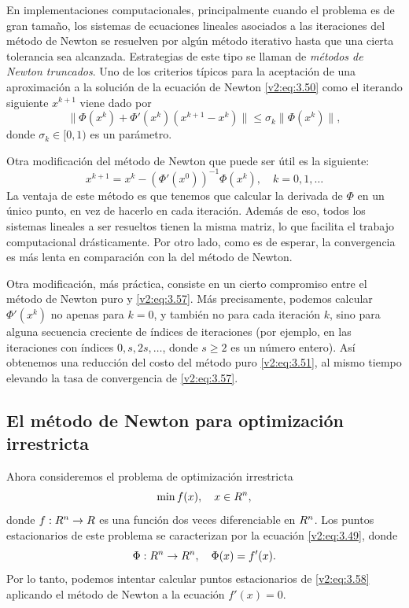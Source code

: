 En implementaciones computacionales, principalmente cuando el problema es de gran tamaño, los sistemas de ecuaciones lineales asociados a las iteraciones del método de Newton se resuelven por algún método iterativo hasta que una cierta tolerancia sea alcanzada. Estrategias de este tipo se llaman de \textit{métodos de Newton truncados}. Uno de los criterios típicos para la aceptación de una aproximación a la solución de la ecuación de Newton \eqref{v2:eq:3.50} como el iterando siguiente $x^{k+1}$ viene dado por
\begin{equation}
    \|\Phi(x^k) + \Phi'(x^k)(x^{k+1} - x^k)\| \le \sigma_k \|\Phi(x^k)\|,
    \label{v2:eq:3.56}
\end{equation}
donde $\sigma_k \in [0, 1)$ es un parámetro.

Otra modificación del método de Newton que puede ser útil es la siguiente:
\begin{equation}
    x^{k+1} = x^k - (\Phi'(x^0))^{-1}\Phi(x^k), \quad k = 0, 1, \dots
    \label{v2:eq:3.57}
\end{equation}
La ventaja de este método es que tenemos que calcular la derivada de $\Phi$ en un único punto, en vez de hacerlo en cada iteración. Además de eso, todos los sistemas lineales a ser resueltos tienen la misma matriz, lo que facilita el trabajo computacional drásticamente. Por otro lado, como es de esperar, la convergencia es más lenta en comparación con la del método de Newton.

Otra modificación, más práctica, consiste en un cierto compromiso entre el método de Newton puro y \eqref{v2:eq:3.57}. Más precisamente, podemos calcular $\Phi'(x^k)$ no apenas para $k = 0$, y también no para cada iteración $k$, sino para alguna secuencia creciente de índices de iteraciones (por ejemplo, en las iteraciones con índices $0, s, 2s, \dots$, donde $s \ge 2$ es un número entero). Así obtenemos una reducción del costo del método puro \eqref{v2:eq:3.51}, al mismo tiempo elevando la tasa de convergencia de \eqref{v2:eq:3.57}.

\subsection{El método de Newton para optimización irrestricta}\label{v2:sec:3.2.2}

Ahora consideremos el problema de optimización irrestricta
\begin{equation}
    \min f(x), \quad x \in R^n,
    \label{v2:eq:3.58}
\end{equation}
donde $f : R^n \to R$ es una función dos veces diferenciable en $R^n$. Los puntos estacionarios de este problema se caracterizan por la ecuación \eqref{v2:eq:3.49}, donde
\[
    \Phi : R^n \to R^n, \quad \Phi(x) = f'(x).
\]
Por lo tanto, podemos intentar calcular puntos estacionarios de \eqref{v2:eq:3.58} aplicando el método de Newton a la ecuación $f'(x) = 0$.

